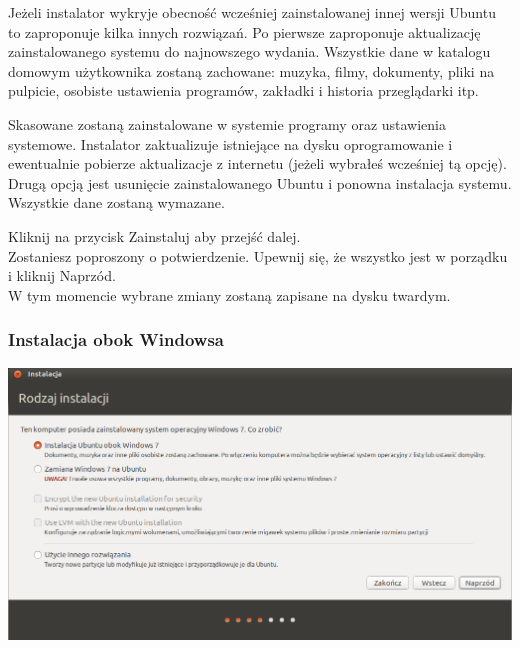 Jeżeli instalator wykryje obecność wcześniej zainstalowanej innej wersji Ubuntu to zaproponuje kilka innych rozwiązań.
Po pierwsze zaproponuje aktualizację zainstalowanego systemu do najnowszego wydania. Wszystkie dane w katalogu domowym użytkownika zostaną zachowane: muzyka, filmy, dokumenty, pliki na pulpicie, osobiste ustawienia programów, zakładki i historia przeglądarki itp.

Skasowane zostaną zainstalowane w systemie programy oraz ustawienia systemowe. Instalator zaktualizuje istniejące na dysku oprogramowanie i ewentualnie pobierze aktualizacje z internetu (jeżeli wybrałeś wcześniej tą opcję).
Drugą opcją jest usunięcie zainstalowanego Ubuntu i ponowna instalacja systemu. Wszystkie dane zostaną wymazane.
\begin{flushright}
Kliknij na przycisk \textcolor{ubuntu_orange}{Zainstaluj} aby przejść dalej.\\
Zostaniesz poproszony o potwierdzenie. Upewnij się, że wszystko jest w porządku i kliknij \textcolor{ubuntu_orange}{Naprzód}.\\
W tym momencie wybrane zmiany zostaną zapisane na dysku twardym.
\end{flushright}
\clearpage
\subsubsection{Instalacja obok Windowsa}
\begin{center}
        \includegraphics[width=\linewidth]{images/instalator_partycjonowanie_obok_wondows7.png}
\end{center}

